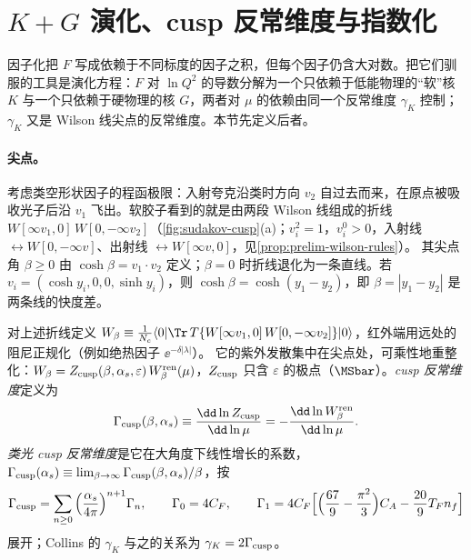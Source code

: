 \section{\texorpdfstring{$K+G$}{K+G} 演化、cusp 反常维度与指数化}\label{sec:sudakov-evolution}

因子化把 $F$ 写成依赖于不同标度的因子之积，但每个因子仍含大对数。把它们驯服的工具是演化方程：$F$ 对 $\ln Q^2$ 的导数分解为一个只依赖于低能物理的“软”核 $K$
与一个只依赖于硬物理的核 $G$，两者对 $\mu$ 的依赖由同一个反常维度 $\gamma_K$ 控制；$\gamma_K$ 又是 Wilson 线尖点的反常维度。本节先定义后者。

\paragraph{尖点。}考虑类空形状因子的程函极限：入射夸克沿类时方向 $v_2$ 自过去而来，在原点被吸收光子后沿 $v_1$ 飞出。软胶子看到的就是由两段 Wilson 线组成的折线
$W[\infty v_1,0]\,W[0,-\infty v_2]$（\cref{fig:sudakov-cusp}(a)；$v_i^2=1$，$v_i^0>0$，入射线 $\leftrightarrow W[0,-\infty v]$、出射线 $\leftrightarrow W[\infty v,0]$，见\cref{prop:prelim-wilson-rules}）。
其尖点角 $\beta\ge0$ 由 $\cosh\beta=v_1\cdot v_2$ 定义；$\beta=0$ 时折线退化为一条直线。若 $v_i=(\cosh y_i,0,0,\sinh y_i)$，则 $\cosh\beta=\cosh(y_1-y_2)$，即 $\beta=|y_1-y_2|$ 是两条线的快度差。

\begin{definition}\label{def:sudakov-cusp}
对上述折线定义 $W_\beta\equiv\frac1{N_c}\langle0|\Tr\,T\{W[\infty v_1,0]\,W[0,-\infty v_2]\}|0\rangle$，红外端用远处的阻尼正规化（例如绝热因子 $\ee^{-\delta|\lambda|}$）。
它的紫外发散集中在尖点处，可乘性地重整化：$W_\beta=Z_{\rm cusp}(\beta,\alpha_s,\varepsilon)\,W_\beta^{\rm ren}(\mu)$，$Z_{\rm cusp}$ 只含 $\varepsilon$ 的极点（$\MSbar$）。\emph{cusp 反常维度}定义为
\begin{equation}\label{eq:sudakov-cusp-def}
\Gamma_{\rm cusp}(\beta,\alpha_s)\equiv\frac{\dd\ln Z_{\rm cusp}}{\dd\ln\mu}=-\frac{\dd\ln W_\beta^{\rm ren}}{\dd\ln\mu} .
\end{equation}
\emph{类光 cusp 反常维度}是它在大角度下线性增长的系数，$\Gamma_{\rm cusp}(\alpha_s)\equiv\lim_{\beta\to\infty}\Gamma_{\rm cusp}(\beta,\alpha_s)/\beta$，按
\begin{equation}\label{eq:sudakov-cusp-series}
\Gamma_{\rm cusp}=\sum_{n\ge0}\Big(\frac{\alpha_s}{4\pi}\Big)^{n+1}\Gamma_n,\qquad \Gamma_0=4C_F,\qquad
\Gamma_1=4C_F\Big[\Big(\frac{67}9-\frac{\pi^2}3\Big)C_A-\frac{20}9T_Fn_f\Big]
\end{equation}
展开；Collins 的 $\gamma_K$ 与之的关系为 $\gamma_K=2\Gamma_{\rm cusp}$。
\end{definition}

